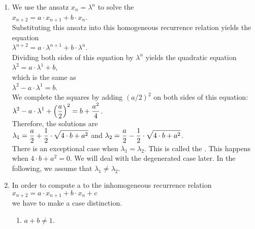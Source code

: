 \begin{enumerate}
\item We use the ansatz $x_n = \lambda^n$ to solve the 
      \\[0.2cm]
      \hspace*{1.3cm}
      $x_{n+2} = a \cdot x_{n+1} + b \cdot x_n$.
      \\[0.2cm]
      Substituting this ansatz into this homogeneous recurrence relation yields the equation
      \\[0.2cm]
      \hspace*{1.3cm}
      $\lambda^{n+2} = a \cdot \lambda^{n+1} + b \cdot \lambda^n$.
      \\[0.2cm]
      Dividing both sides of this equation by $\lambda^n$ yields the quadratic equation
      \\[0.2cm]
      \hspace*{1.3cm}
      $\lambda^{2} = a \cdot \lambda^{1} + b$,
      \\[0.2cm]
      which is the same as
      \\[0.2cm]
      \hspace*{1.3cm}
      $\lambda^{2} - a \cdot \lambda^{1} = b$.
      \\[0.2cm]
      We complete the squares by adding $(a/2)^2$ on both sides of this equation:
      \\[0.2cm]
      \hspace*{1.3cm}
      $\displaystyle \lambda^{2} - a \cdot \lambda^{1} + \Bigl(\frac{a}{2}\Bigr)^2 = b + \frac{a^2}{4}$.
      \\[0.2cm]
      Therefore, the solutions are
      \\[0.2cm]
      \hspace*{1.3cm}
      $\displaystyle\lambda_1 = \frac{a}{2} + \frac{1}{2} \cdot \sqrt{4 \cdot b + a^2}$ \quad and \quad
      $\displaystyle\lambda_2 = \frac{a}{2} - \frac{1}{2} \cdot \sqrt{4 \cdot b + a^2}$.
      \\[0.2cm]
      There is an exceptional case when $\lambda_1 = \lambda_2$.  This is called the 
      .
      This happens when $4 \cdot b + a^2 = 0$.  We will deal with the degenerated case later.  In the
      following, we assume that $\lambda_1 \not= \lambda_2$.
\item In order to compute a   to the inhomogeneous recurrence relation
      \\[0.2cm]
      \hspace*{1.3cm}
      $x_{n+2} = a \cdot x_{n+1} + b \cdot x_n + c$
      \\[0.2cm]
      we have to make a case distinction.
      \begin{enumerate}
      \item $a + b \not= 1$.


\end{enumerate}
\end{enumerate}
